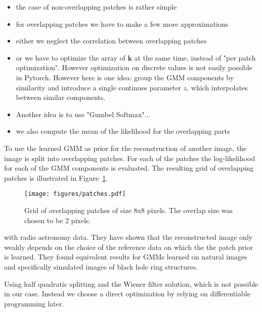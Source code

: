 \documentclass[twocolumn]{aastex631}
\begin{document}
    \begin{itemize}
        \item the case of non-overlapping patches is rather simple
        \item for overlapping patches we have to make a few more approximations
        \item either we neglect the correlation between overlapping patches
        \item or we have to optimize the array of $\mathbf{k}$ at the same time, instead of "per patch optimization". However optimization on discrete 
        values is not easily possible in Pytorch. However here is one idea:
        group the GMM components by similarity and introduce a single continues
        parameter $z$, which interpolates between similar components.
        \item Another idea is to use "Gumbel Softmax"...
        \item we also compute the mean of the likelihood for the overlapping parts
    \end{itemize}

    To use the learned GMM as prior for the reconstruction of another image, the image is split into overlapping patches. For each of the patches the log-likelihood for each of the GMM components is evaluated. The resulting grid of overlapping patches is illustrated in Figure~\ref{fig:patches}.

    \begin{figure}
        \begin{centering}
            \texttt{[image: figures/patches.pdf]}
            \caption{
                Grid of overlapping patches of size 8x8 pixels. The overlap size was chosen to be 2 pixels.
            }
            \label{fig:patches}
        \end{centering}
    \end{figure}

    with radio astronomy data.
    They have shown that the reconstructed image only weakly depends on the choice
    of the reference data on which the the patch prior is learned. They found
    equivalent results for GMMs learned on natural images and specifically
    simulated images of black hole ring structures.

    Using half quadratic splitting and the Wiener filter solution, which is not possible
    in our case. Instead we choose a direct optimization by relying on differentiable
    programming later. 
    
\end{document}
